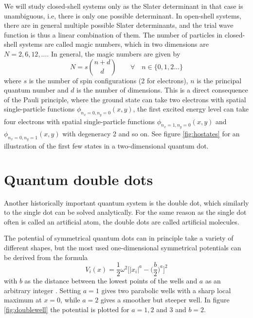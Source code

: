 We will study closed-shell systems only as the Slater determinant in that case is unambiguous, i.e, there is only one possible determinant. In open-shell systems, there are in general multiple possible Slater determinants, and the trial wave function is thus a linear combination of them. The number of particles in closed-shell systems are called magic numbers, which in two dimensions are $N=2,6,12,\hdots$. In general, the magic numbers are given by
\begin{equation}
N=s\binom{n+d}{d} \quad\quad\forall\quad n\in\{0,1,2...\}
\label{eq:HOclosedshell}
\end{equation}
where $s$ is the number of spin configurations (2 for electrons), $n$ is the principal quantum number and $d$ is the number of dimensions. This is a direct consequence of the Pauli principle, where the ground state can take two electrons with spatial single-particle functions $\phi_{n_x=0,n_y=0}(x,y)$, the first excited energy level can take four electrons with spatial single-particle functions $\phi_{n_x=1,n_y=0}(x,y)$ and $\phi_{n_x=0,n_y=1}(x,y)$ with degeneracy 2 and so on. See figure \eqref{fig:hostates} for an illustration of the first few states in a two-dimensional quantum dot. 


%

\section{Quantum double dots} \label{sec:doubledots}
Another historically important quantum system is the double dot, which similarly to the single dot can be solved analytically. For the same reason as the single dot often is called an artificial atom, the double dots are called artificial molecules. 

The potential of symmetrical quantum dots can in principle take a variety of different shapes, but the most used one-dimensional symmetrical potentials can be derived from the formula
\begin{equation}
V_i(x)=\frac{1}{2}\omega^2\bigg[|x_i|^a-\Big(\frac{b}{2}\Big)^a\bigg]^2
\label{eq:doublewell}
\end{equation}
with $b$ as the distance between the lowest points of the wells and $a$ as an arbitrary integer \cite{jelic_double_2012}. Setting $a=1$ gives two parabolic wells with a sharp local maximum at $x=0$, while $a=2$ gives a smoother but steeper well. In figure \eqref{fig:doublewell} the potential is plotted for $a=1,2$ and $3$ and $b=2$.

